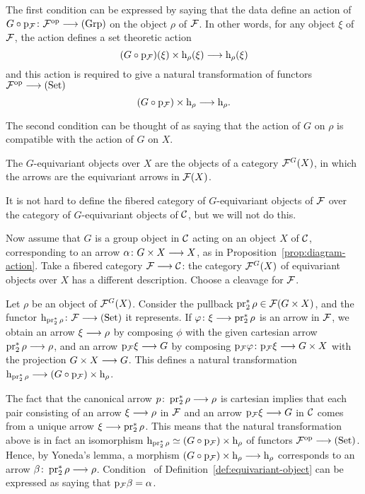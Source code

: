 \begin{3   FIBERED CATEGORIES}
\begin{3.8 Equivariant objects in fibcats}
The first condition can be expressed by saying that the data define an action of $G \circ \p_{\cF} \colon \cF\op \arr \catgrp$ on the object $\rho$ of $\mathcal{F}$. In other words, for any object $\xi$ of $\mathcal{F}$, the action defines a set theoretic action
   \[
   (G \circ \p_{\cF})(\xi) \times \h_{\rho}(\xi)
   \arr \h_{\rho}(\xi)
   \]
and this action is required to give a natural transformation of functors $\cF\op \arr \catset$
   \[
   (G \circ \p_{\cF})\times \h_{\rho}
   \arr \h_{\rho}.
   \]

The second condition can be thought of as saying that the action of $G$ on $\rho$ is compatible with the action of $G$ on $X$.

The $G$-equivariant objects over $X$ are the objects of a category $\mathcal{F}^G(X)$, in which the arrows are the equivariant arrows in $\mathcal{F}(X)$. 

It is not hard to define the fibered category of $G$-equivariant objects of $\mathcal{F}$ over the category of $G$-equivariant objects of $\mathcal{C}$, but we will not do this.

Now assume that $G$ is a group object in $\mathcal{C}$ acting on an object $X$ of $\mathcal{C}$, corresponding to  an arrow $\alpha \colon G \times X \arr X$, as in Proposition~\ref{prop:diagram-action}. Take a fibered category $\cF \arr \cC$: the category $\mathcal{F}^{G}(X)$ of equivariant objects over $X$ has a different description. Choose a cleavage for $\mathcal{F}$.

Let $\rho$ be an object of $\mathcal{F}^{G}(X)$. Consider the pullback $\operatorname{pr}_2^*\rho \in \mathcal{F}(G \times X)$, and the functor $\h_{\pr_2^*\rho} \colon \cF \arr \catset$ it represents. If $\phi \colon \xi \arr \pr_2^* \rho$ is an arrow in $\mathcal{F}$, we obtain an arrow $\xi \arr \rho$ by composing $\phi$ with the given cartesian arrow $\pr_2^* \rho \arr \rho$, and an arrow $\p_{\cF}\xi \arr G$ by composing $\p_{\cF}\phi \colon \p_{\cF} \xi \arr G \times X$ with the projection $G \times X \arr G$. This defines a natural transformation $\h_{\pr_2^*\rho} \arr (G \circ \p_{\cF}) \times \h_\rho$.

The fact that the canonical arrow $p \colon \pr_2^* \rho \arr \rho$ is cartesian implies that each pair consisting of an arrow $\xi \arr \rho$ in $\mathcal{F}$ and an arrow $\p_{\cF}\xi \arr G$ in $\mathcal{C}$ comes from a unique arrow $\xi \arr \pr_{2}^{*}\rho$. This means that the natural transformation above is in fact an isomorphism $\mathrm{h}_{\operatorname{pr}_2^*\rho} \simeq (G \circ \mathrm{p}_{\mathcal{F}}) \times \mathrm{h}_\rho$ of functors $\cF\op \arr \catset$. Hence, by Yoneda's lemma, a morphism $(G \circ \p_{\cF}) \times \h_\rho \arr \h_\rho$ corresponds to an arrow $\beta\colon \pr_2^*\rho \arr \rho$. Condition~ of Definition~\ref{def:equivariant-object} can be expressed as saying that $\mathrm{p}_{\mathcal{F}}\beta = \alpha$.


\end{3.8 Equivariant objects in fibcats}
\end{3   FIBERED CATEGORIES}
